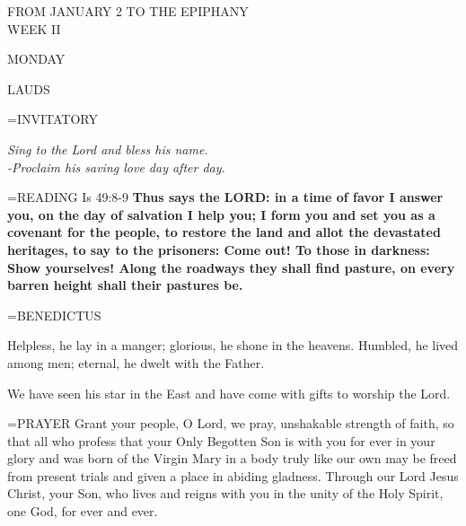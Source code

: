 \begin{center}\normalsize FROM JANUARY 2 TO THE EPIPHANY\\
\footnotesize WEEK II\\
\end{center}

\begin{center}
\normalsize MONDAY
\end{center}

\begin{flushleft}\normalsize LAUDS\\\end{flushleft}

\hangindent=\parindent \small{INVITATORY}
\begin{center}
\textit{Sing to the Lord and bless his name.\\}
\textit{-Proclaim his saving love day after day.\\}
\end{center}

\hangindent=\parindent \small{\uppercase{READING}}    Is 49:8-9 \textbf{   Thus says the LORD: in a time of favor I answer you, on the day of salvation I help you; I form you and set you as a covenant for the people, to restore the land and allot the devastated heritages, to say to the prisoners: Come out! To those in darkness: Show yourselves! Along the roadways they shall find pasture, on every barren height shall their pastures be.\\}

\hangindent=\parindent \small BENEDICTUS
\begin{description}[labelindent=\parindent, leftmargin=*]
\item [(before the Epiphany):]  Helpless, he lay in a manger; glorious, he shone in the heavens. Humbled, he lived among men; eternal, he dwelt with the Father.
\item [(Wednesday after the Epiphany):]  We have seen his star in the East and have come with gifts to worship the Lord.
\end{description}


\hangindent=\parindent \small{PRAYER 	Grant your people, O Lord, we pray, unshakable strength of faith, so that all who profess that your Only Begotten Son is with you for ever in your glory and was born of the Virgin Mary in a body truly like our own may be freed from present trials and given a place in abiding gladness. Through our Lord Jesus Christ, your Son, who lives and reigns with you in the unity of the Holy Spirit, one God, for ever and ever.}

